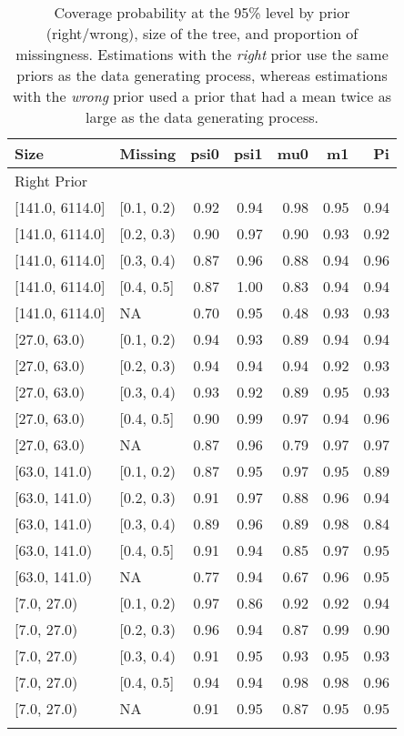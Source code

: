 \begin{table}[ht]
\centering
\begin{tabular}{llrrrrr}
  \toprule
Size & Missing & psi0 & psi1 & mu0 & m1 & Pi \\ 
  \midrule
\multicolumn{7}{l}{Right Prior}\\
{[141.0, 6114.0]} & {[0.1, 0.2)} & 0.92 & 0.94 & 0.98 & 0.95 & 0.94 \\ 
  {[141.0, 6114.0]} & {[0.2, 0.3)} & 0.90 & 0.97 & 0.90 & 0.93 & 0.92 \\ 
  {[141.0, 6114.0]} & {[0.3, 0.4)} & 0.87 & 0.96 & 0.88 & 0.94 & 0.96 \\ 
  {[141.0, 6114.0]} & {[0.4, 0.5]} & 0.87 & 1.00 & 0.83 & 0.94 & 0.94 \\ 
  {[141.0, 6114.0]} & {NA} & 0.70 & 0.95 & 0.48 & 0.93 & 0.93 \\ 
  {[27.0, 63.0)} & {[0.1, 0.2)} & 0.94 & 0.93 & 0.89 & 0.94 & 0.94 \\ 
  {[27.0, 63.0)} & {[0.2, 0.3)} & 0.94 & 0.94 & 0.94 & 0.92 & 0.93 \\ 
  {[27.0, 63.0)} & {[0.3, 0.4)} & 0.93 & 0.92 & 0.89 & 0.95 & 0.93 \\ 
  {[27.0, 63.0)} & {[0.4, 0.5]} & 0.90 & 0.99 & 0.97 & 0.94 & 0.96 \\ 
  {[27.0, 63.0)} & {NA} & 0.87 & 0.96 & 0.79 & 0.97 & 0.97 \\ 
  {[63.0, 141.0)} & {[0.1, 0.2)} & 0.87 & 0.95 & 0.97 & 0.95 & 0.89 \\ 
  {[63.0, 141.0)} & {[0.2, 0.3)} & 0.91 & 0.97 & 0.88 & 0.96 & 0.94 \\ 
  {[63.0, 141.0)} & {[0.3, 0.4)} & 0.89 & 0.96 & 0.89 & 0.98 & 0.84 \\ 
  {[63.0, 141.0)} & {[0.4, 0.5]} & 0.91 & 0.94 & 0.85 & 0.97 & 0.95 \\ 
  {[63.0, 141.0)} & {NA} & 0.77 & 0.94 & 0.67 & 0.96 & 0.95 \\ 
  {[7.0, 27.0)} & {[0.1, 0.2)} & 0.97 & 0.86 & 0.92 & 0.92 & 0.94 \\ 
  {[7.0, 27.0)} & {[0.2, 0.3)} & 0.96 & 0.94 & 0.87 & 0.99 & 0.90 \\ 
  {[7.0, 27.0)} & {[0.3, 0.4)} & 0.91 & 0.95 & 0.93 & 0.95 & 0.93 \\ 
  {[7.0, 27.0)} & {[0.4, 0.5]} & 0.94 & 0.94 & 0.98 & 0.98 & 0.96 \\ 
  {[7.0, 27.0)} & {NA} & 0.91 & 0.95 & 0.87 & 0.95 & 0.95 \\ 
   \bottomrule
\multicolumn{7}{l}{}\\
\end{tabular}
\caption{Coverage probability at the 95\% level by prior (right/wrong), size of the tree, and proportion of missingness.  Estimations with the \emph{right} prior use the same priors as the data generating process, whereas estimations with the \emph{wrong} prior used a prior that had a mean twice as large as the data generating process.} 
\label{tab:coverage95-method-size-missigness}
\end{table}
